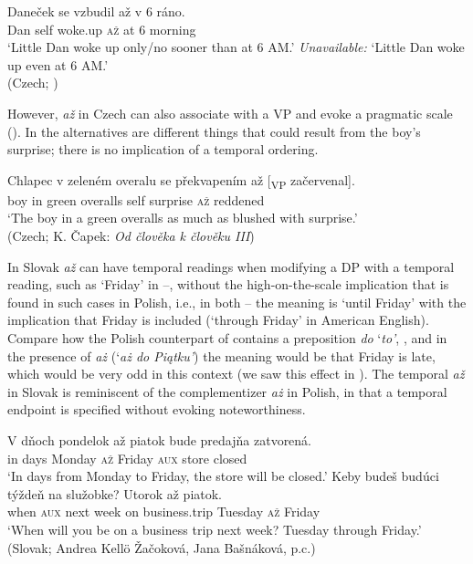 \documentclass[output=paper,colorlinks,citecolor=brown]{langscibook}
\begin{document}
\ea\label{ex:tom:91}
\gll Daneček se vzbudil až v 6 ráno.\\
Dan self woke.up \textsc{až} at 6 morning \\
\ea `Little Dan woke up only/no sooner than at 6 AM.’ 
\ex \textit{Unavailable:} `Little Dan woke up even at 6 AM.’\\\hfill (Czech; \cite[(6)]{tomaszewicz13a}) 
\z 
\z 

\noindent However, \textit{až} in Czech can also associate with a VP and evoke a pragmatic scale (\citealt{tomaszewicz13,tomaszewicz13a}). In 
the alternatives are different things that could result from the boy’s surprise; there is no implication of a temporal ordering.

\ea\label{ex:tom:92}
\gll Chlapec v zeleném overalu se překvapením až [\textsubscript{VP} začervenal].\\
boy in green overalls self surprise \textsc{až} {} reddened\\%
\glt `The boy in a green overalls as much as blushed with surprise.’\\\hfill (Czech; K. Čapek: \textit{Od člověka k člověku III})
\z 

\noindent In Slovak \textit{až} can have temporal readings when modifying a DP with a temporal reading, such as ‘Friday’ in --, without the high-on-the-scale implication that is found in such cases in Polish, i.e., in both -- the meaning is `until Friday' with the implication that Friday is included (`through Friday' in American English). Compare how the Polish counterpart of  contains a preposition \textit{do} ‘\textit{to’}, , and in the presence of \textit{aż} (‘\textit{aż do Piątku’}) the meaning would be that Friday is late, which would be very odd in this context (we saw this effect in ). The temporal \textit{až} in Slovak is reminiscent of the complementizer \textit{aż} in Polish, in that a temporal endpoint is specified without evoking noteworthiness.

\ea\label{ex:tom:sl1}
\ea\label{ex:tom:sl1a} 
\gll V dňoch pondelok až piatok bude predajňa zatvorená.\\
in days Monday \textsc{až} Friday \textsc{aux} store closed\\
\glt `In days from Monday to Friday, the store will be closed.'
\ex\label{ex:tom:sl1b}            
\gll Keby budeš budúci týždeň na služobke? Utorok až piatok.\\
when \textsc{aux} next week on business.trip Tuesday \textsc{až} Friday\\
\glt `When will you be on a business trip next week? Tuesday through Friday.'\\\hfill (Slovak; Andrea Kellö Žačoková, Jana Bašnáková, p.c.)
\z 
\z
\end{document}
